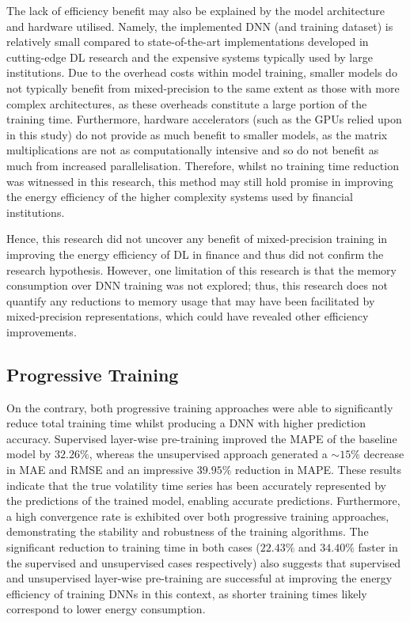 \documentclass[a4paper, 11pt]{report}
\begin{document}
    The lack of efficiency benefit may also be explained by the model architecture and hardware utilised. Namely, the implemented DNN (and training dataset) is relatively small compared to state-of-the-art implementations developed in cutting-edge DL research and the expensive systems typically used by large institutions. Due to the overhead costs within model training, smaller models do not typically benefit from mixed-precision to the same extent as those with more complex architectures, as these overheads constitute a large portion of the training time. Furthermore, hardware accelerators (such as the GPUs relied upon in this study) do not provide as much benefit to smaller models, as the matrix multiplications are not as computationally intensive and so do not benefit as much from increased parallelisation. Therefore, whilst no training time reduction was witnessed in this research, this method may still hold promise in improving the energy efficiency of the higher complexity systems used by financial institutions. 

    Hence, this research did not uncover any benefit of mixed-precision training in improving the energy efficiency of DL in finance and thus did not confirm the research hypothesis. However, one limitation of this research is that the memory consumption over DNN training was not explored; thus, this research does not quantify any reductions to memory usage that may have been facilitated by mixed-precision representations, which could have revealed other efficiency improvements.


    \subsection{Progressive Training}

    On the contrary, both progressive training approaches were able to significantly reduce total training time whilst producing a DNN with higher prediction accuracy. Supervised layer-wise pre-training improved the MAPE of the baseline model by $32.26\%$, whereas the unsupervised approach generated a $\sim \! 15\%$ decrease in MAE and RMSE and an impressive $39.95\%$ reduction in MAPE. These results indicate that the true volatility time series has been accurately represented by the predictions of the trained model, enabling accurate predictions. Furthermore, a high convergence rate is exhibited over both progressive training approaches, demonstrating the stability and robustness of the training algorithms. The significant reduction to training time in both cases ($22.43\%$ and $34.40\%$ faster in the supervised and unsupervised cases respectively) also suggests that supervised and unsupervised layer-wise pre-training are successful at improving the energy efficiency of training DNNs in this context, as shorter training times likely correspond to lower energy consumption.
\end{document}

